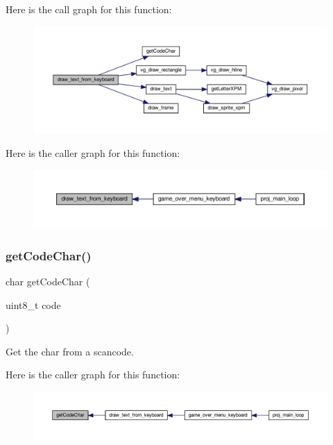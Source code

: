 Here is the call graph for this function\+:\nopagebreak
\begin{figure}[H]
\begin{center}
\leavevmode
\includegraphics[width=350pt]{group__utils_gabe39d5da16482ce154af88c3f78a1000_cgraph}
\end{center}
\end{figure}
Here is the caller graph for this function\+:\nopagebreak
\begin{figure}[H]
\begin{center}
\leavevmode
\includegraphics[width=350pt]{group__utils_gabe39d5da16482ce154af88c3f78a1000_icgraph}
\end{center}
\end{figure}
\mbox{\label{group__utils_ga7891ce0c95b80f1294517ff05b7cb962}} 
\subsubsection{\texorpdfstring{get\+Code\+Char()}{getCodeChar()}}
{\footnotesize\ttfamily char get\+Code\+Char (\begin{DoxyParamCaption}\item[{uint8\+\_\+t}]{code }\end{DoxyParamCaption})}



Get the char from a scancode. 

Here is the caller graph for this function\+:\nopagebreak
\begin{figure}[H]
\begin{center}
\leavevmode
\includegraphics[width=350pt]{group__utils_ga7891ce0c95b80f1294517ff05b7cb962_icgraph}
\end{center}
\end{figure}
\mbox{\label{group__utils_ga8e2a12eed020ad751697c4f2d1a725dc}} 
